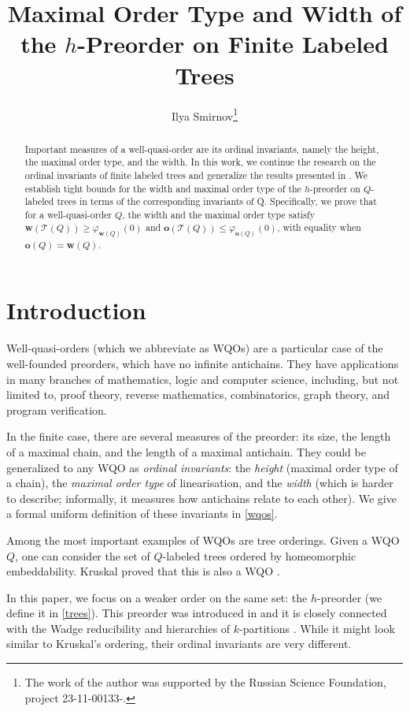 \documentclass[runningheads]{llncs}
\title{Maximal Order Type and Width of the $h$-Preorder on Finite Labeled Trees}
\author{Ilya Smirnov\thanks{The work of the author was supported by the Russian Science Foundation, project 23-11-00133-\mbox{\usefont{T2A}{\rmdefault}{m}{n}\CYRP}.}}
\institute{Department of Mathematics and Computer Science\\ St. Petersburg University, 199178 St. Petersburg, Russia}
\let \leq \leqslant
\let \geq \geqslant
\let \phi \varphi
\def \T {\mathcal{T}}
\def \o {\textbf{o}}
\def \w {\textbf{w}}
\begin{document}
\maketitle

\begin{abstract}
    Important measures of a well-quasi-order are its ordinal invariants, namely the height, the maximal order type, and the width. In this work, we continue the research on the ordinal invariants of finite labeled trees and generalize the results presented in \cite{Selivanov2025}.
    We establish tight bounds for the width and maximal order type of the $h$-preorder on $Q$-labeled trees in terms of the corresponding invariants of Q. Specifically, we prove that for a well-quasi-order $Q$, the width and the maximal order type satisfy $\w(\T(Q)) \geq \phi_{\w(Q)}(0)$ and $\o(\T(Q)) \leq \phi_{\o(Q)}(0)$, with equality when $\o(Q) = \w(Q)$.
\end{abstract}

\section{Introduction}

Well-quasi-orders (which we abbreviate as WQOs) are a particular case of the well-founded preorders, which have no infinite antichains. They have applications in many branches of mathematics, logic and computer science, including, but not limited to, proof theory, reverse mathematics, combinatorics, graph theory, and program verification.

In the finite case, there are several measures of the preorder: its size, the length of a maximal chain, and the length of a maximal antichain. They could be generalized to any WQO as \textit{ordinal invariants}: the \textit{height} (maximal order type of a chain), the \textit{maximal order type} of linearisation, and the \textit{width} (which is harder to describe; informally, it measures how antichains relate to each other). We give a formal uniform definition of these invariants in \cref{wqos}.

Among the most important examples of WQOs are tree orderings. Given a WQO $Q$, one can consider the set of $Q$-labeled trees ordered by homeomorphic embeddability. Kruskal proved that this is also a WQO \cite{Kruskal1960}.

In this paper, we focus on a weaker order on the same set: the $h$-preorder (we define it in \cref{trees}). This preorder was introduced in \cite{Selivanov2011} and it is closely connected with the Wadge reducibility and hierarchies of $k$-partitions \cite{Hertling1993,Selivanov2011}. While it might look similar to Kruskal's ordering, their ordinal invariants are very different.
\end{document}
